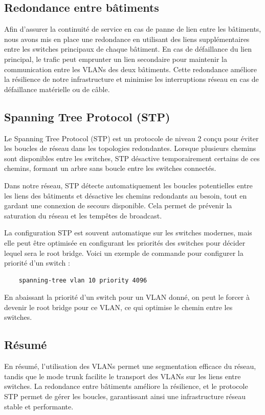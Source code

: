 \documentclass[a4paper,12pt,openany]{report}
\begin{document}
            \subsection{Redondance entre bâtiments}
                Afin d'assurer la continuité de service en cas de panne de lien entre les bâtiments, nous avons mis en place une redondance en utilisant des liens supplémentaires entre les switches principaux de chaque bâtiment. En cas de défaillance du lien principal, le trafic peut emprunter un lien secondaire pour maintenir la communication entre les VLANs des deux bâtiments. Cette redondance améliore la résilience de notre infrastructure et minimise les interruptions réseau en cas de défaillance matérielle ou de câble.

            \subsection{Spanning Tree Protocol (STP)}
                Le Spanning Tree Protocol (STP) est un protocole de niveau 2 conçu pour éviter les boucles de réseau dans les topologies redondantes. Lorsque plusieurs chemins sont disponibles entre les switches, STP désactive temporairement certains de ces chemins, formant un arbre sans boucle entre les switches connectés. 

                Dans notre réseau, STP détecte automatiquement les boucles potentielles entre les liens des bâtiments et désactive les chemins redondants au besoin, tout en gardant une connexion de secours disponible. Cela permet de prévenir la saturation du réseau et les tempêtes de broadcast.

                La configuration STP est souvent automatique sur les switches modernes, mais elle peut être optimisée en configurant les priorités des switches pour décider lequel sera le root bridge. Voici un exemple de commande pour configurer la priorité d'un switch :

                \begin{verbatim}
    spanning-tree vlan 10 priority 4096
                \end{verbatim}

                En abaissant la priorité d'un switch pour un VLAN donné, on peut le forcer à devenir le root bridge pour ce VLAN, ce qui optimise le chemin entre les switches.

            \subsection{Résumé}
                En résumé, l'utilisation des VLANs permet une segmentation efficace du réseau, tandis que le mode trunk facilite le transport des VLANs sur les liens entre switches. La redondance entre bâtiments améliore la résilience, et le protocole STP permet de gérer les boucles, garantissant ainsi une infrastructure réseau stable et performante.
\end{document}
